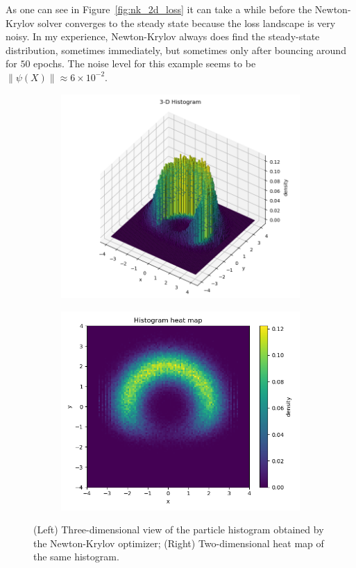 \documentclass{article}
\newcommand{\norm}[1]{\left\lVert #1 \right\rVert}
\begin{document}
As one can see in Figure~\ref{fig:nk_2d_loss} it can take a while before the Newton-Krylov solver converges to the steady state because the loss landscape is very noisy. In my experience, Newton-Krylov always does find the steady-state distribution, sometimes immediately, but sometimes only after bouncing around for $50$ epochs. The noise level for this example seems to be $\norm{\psi(X)} \approx 6 \times 10^{-2}$.
\begin{figure}
    \centering
    \begin{subfigure}[t]{0.5\linewidth}
        \centering
        \includegraphics[width=\linewidth]{figures/NK_3d_view.png}
    \end{subfigure}%
    \begin{subfigure}[t]{0.5\linewidth}
        \centering
        \includegraphics[width=\linewidth]{figures/NK_2d_view.png}
    \end{subfigure}
\caption{(Left) Three-dimensional view of the particle histogram obtained by the Newton-Krylov optimizer; (Right) Two-dimensional heat map of the same histogram.}
\label{fig:NK_2d_results}
\end{figure}
\end{document}
